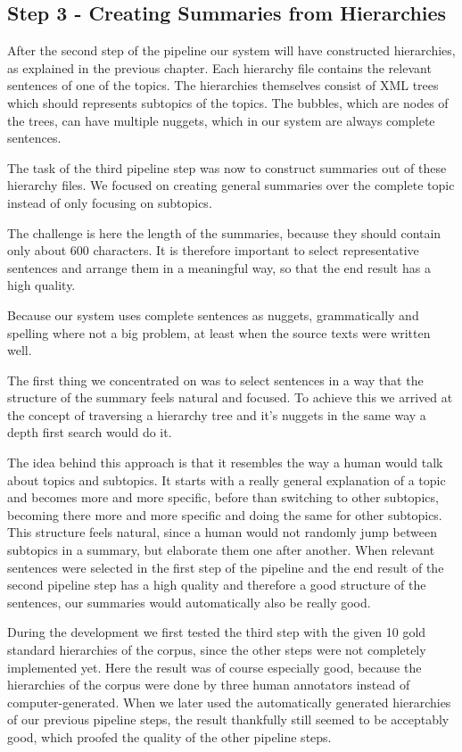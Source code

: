 
\subsection{Step 3 - Creating Summaries from Hierarchies}
After the second step of the pipeline our system will have constructed hierarchies, as explained in the previous chapter. Each hierarchy file contains the relevant sentences of one of the topics. The hierarchies themselves consist of XML trees which should represents subtopics of the topics. The bubbles, which are nodes of the trees, can have multiple nuggets, which in our system are always complete sentences.

The task of the third pipeline step was now to construct summaries out of these hierarchy files. We focused on creating general summaries over the complete topic instead of only focusing on subtopics. 

The challenge is here the length of the summaries, because they should contain only about 600 characters. It is therefore important to select representative sentences and arrange them in a meaningful way, so that the end result has a high quality. 

Because our system uses complete sentences as nuggets, grammatically and spelling
where not a big problem, at least when the source texts were written well.

The first thing we concentrated on was to select sentences in a way that the structure of the summary feels natural and focused. To achieve this we arrived at the concept of traversing a hierarchy tree and it's nuggets in the same way a depth
first search would do it.

The idea behind this approach is that it resembles the way a human would talk about topics and subtopics. It starts with a really general
explanation of a topic and becomes more and more specific, before than switching to other subtopics, becoming there more and more specific and doing the same for other subtopics. This structure feels natural, since a human would not randomly jump between subtopics in a summary, but elaborate them one after another. When relevant sentences were selected in the first step of the pipeline and the end result of the second pipeline step has a high quality and therefore a good structure of the sentences, our summaries would automatically
also be really good.

During the development we first tested the third step with the given 10 gold standard hierarchies of the corpus, since the other steps were not completely implemented yet. Here the result was of course especially good, because the hierarchies of the corpus were done by three human annotators instead of computer-generated. When we later used the automatically generated hierarchies of our previous pipeline steps, the result thankfully still seemed to be acceptably good, which proofed the quality of the other pipeline steps.

